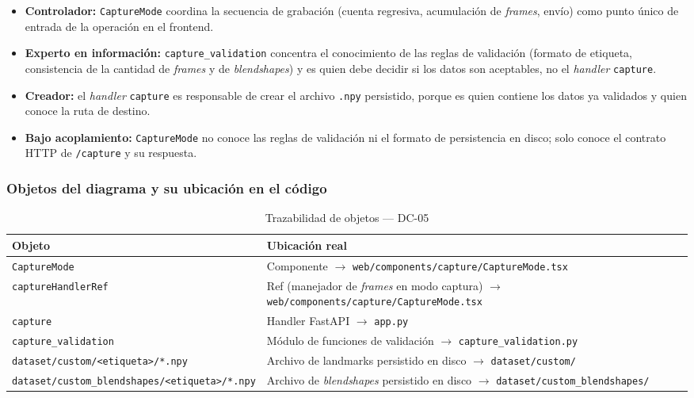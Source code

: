 \begin{itemize}[leftmargin=*, itemsep=2pt]
    \item \textbf{Controlador:} \texttt{CaptureMode} coordina la secuencia de
    grabación (cuenta regresiva, acumulación de \textit{frames}, envío) como
    punto único de entrada de la operación en el frontend.
    \item \textbf{Experto en información:} \texttt{capture\_validation}
    concentra el conocimiento de las reglas de validación (formato de
    etiqueta, consistencia de la cantidad de \textit{frames} y de
    \textit{blendshapes}) y es quien debe decidir si los datos son
    aceptables, no el \textit{handler} \texttt{capture}.
    \item \textbf{Creador:} el \textit{handler} \texttt{capture} es
    responsable de crear el archivo \texttt{.npy} persistido, porque es
    quien contiene los datos ya validados y quien conoce la ruta de
    destino.
    \item \textbf{Bajo acoplamiento:} \texttt{CaptureMode} no conoce las
    reglas de validación ni el formato de persistencia en disco; solo conoce
    el contrato HTTP de \texttt{/capture} y su respuesta.
\end{itemize}

\subsubsection{Objetos del diagrama y su ubicación en el código}

\begin{table}[H]
\centering
\begin{tabularx}{\textwidth}{@{}l X@{}}
\toprule
\textbf{Objeto} & \textbf{Ubicación real} \\
\midrule
\texttt{CaptureMode} & Componente $\rightarrow$ \texttt{web/components/capture/CaptureMode.tsx} \\
\texttt{captureHandlerRef} & Ref (manejador de \textit{frames} en modo captura) $\rightarrow$ \texttt{web/components/capture/CaptureMode.tsx} \\
\texttt{capture} & Handler FastAPI $\rightarrow$ \texttt{app.py} \\
\texttt{capture\_validation} & Módulo de funciones de validación $\rightarrow$ \texttt{capture\_validation.py} \\
\texttt{dataset/custom/<etiqueta>/*.npy} & Archivo de landmarks persistido en disco $\rightarrow$ \texttt{dataset/custom/} \\
\texttt{dataset/custom\_blendshapes/<etiqueta>/*.npy} & Archivo de \textit{blendshapes} persistido en disco $\rightarrow$ \texttt{dataset/custom\_blendshapes/} \\
\bottomrule
\end{tabularx}
\caption{Trazabilidad de objetos --- DC-05}
\label{tab:col-objetos-dc05}
\end{table}

